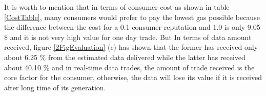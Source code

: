 \documentclass[letterpaper, 10 pt, conference]{ieeeconf}  %
\begin{document}
It is worth to mention that in terms of consumer cost as shown in table \ref{CostTable}, many consumers would prefer to pay the lowest gas possible  because the difference between the cost for a 0.1 consumer reputation and 1.0 is only 9.05 \$ and it is not very high value for one day trade. But In terms of data amount received, figure \ref{2FigEvaluation} (c) has shown that the former has received only about 6.25 \% from the estimated data delivered while the latter has received about 40.10 \% and in real-time data trades, the amount of trade received is the core factor for the consumer, otherwise, the data will lose its value if it is received after long time of its generation. 







\end{document}
